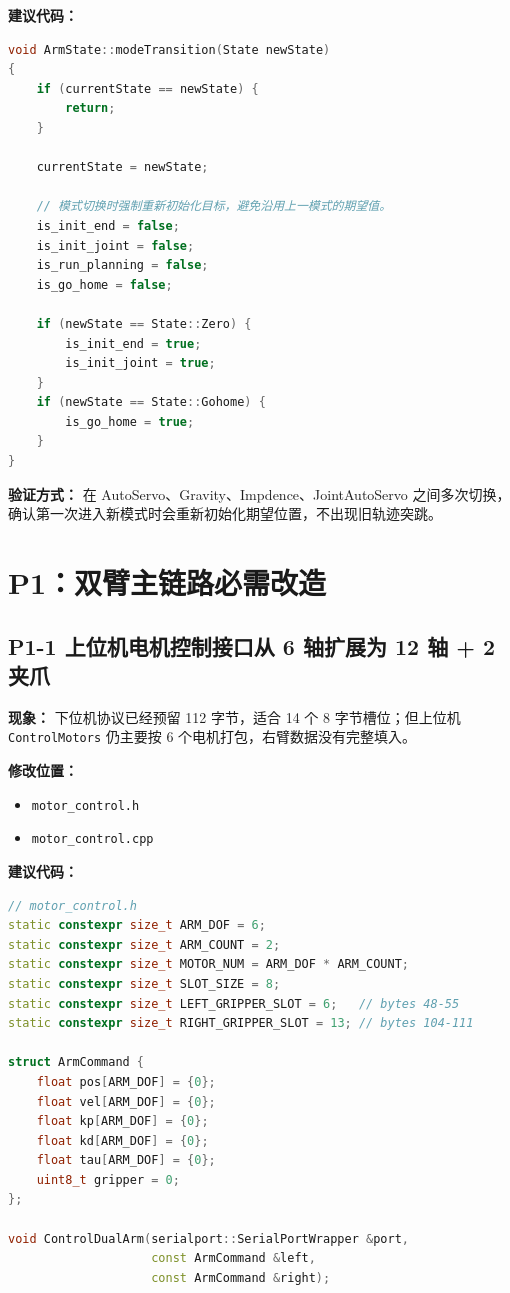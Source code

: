 \documentclass[UTF8,a4paper,11pt]{ctexart}
\begin{document}
\textbf{建议代码：}
\begin{lstlisting}[language=C++]
void ArmState::modeTransition(State newState)
{
    if (currentState == newState) {
        return;
    }

    currentState = newState;

    // 模式切换时强制重新初始化目标，避免沿用上一模式的期望值。
    is_init_end = false;
    is_init_joint = false;
    is_run_planning = false;
    is_go_home = false;

    if (newState == State::Zero) {
        is_init_end = true;
        is_init_joint = true;
    }
    if (newState == State::Gohome) {
        is_go_home = true;
    }
}
\end{lstlisting}

\textbf{验证方式：} 在 AutoServo、Gravity、Impdence、JointAutoServo 之间多次切换，确认第一次进入新模式时会重新初始化期望位置，不出现旧轨迹突跳。

\section{P1：双臂主链路必需改造}

\subsection{P1-1 上位机电机控制接口从 6 轴扩展为 12 轴 + 2 夹爪}

\textbf{现象：} 下位机协议已经预留 112 字节，适合 14 个 8 字节槽位；但上位机 \verb|ControlMotors| 仍主要按 6 个电机打包，右臂数据没有完整填入。

\textbf{修改位置：}
\begin{itemize}[leftmargin=2em]
  \item \verb|motor_control.h|
  \item \verb|motor_control.cpp|
\end{itemize}

\textbf{建议代码：}
\begin{lstlisting}[language=C++]
// motor_control.h
static constexpr size_t ARM_DOF = 6;
static constexpr size_t ARM_COUNT = 2;
static constexpr size_t MOTOR_NUM = ARM_DOF * ARM_COUNT;
static constexpr size_t SLOT_SIZE = 8;
static constexpr size_t LEFT_GRIPPER_SLOT = 6;   // bytes 48-55
static constexpr size_t RIGHT_GRIPPER_SLOT = 13; // bytes 104-111

struct ArmCommand {
    float pos[ARM_DOF] = {0};
    float vel[ARM_DOF] = {0};
    float kp[ARM_DOF] = {0};
    float kd[ARM_DOF] = {0};
    float tau[ARM_DOF] = {0};
    uint8_t gripper = 0;
};

void ControlDualArm(serialport::SerialPortWrapper &port,
                    const ArmCommand &left,
                    const ArmCommand &right);
\end{lstlisting}
\end{document}
